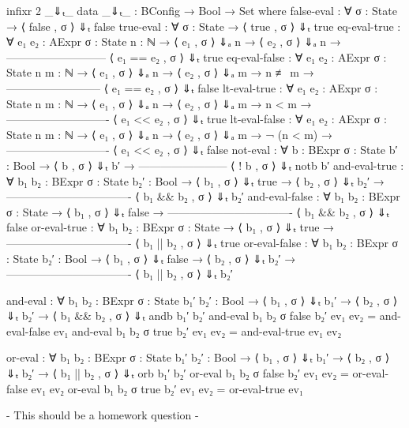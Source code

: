 \documentclass{lecturenotes}
\begin{document}
\begin{code}[hide]
infixr 2 _⇓ₜ_
data _⇓ₜ_ : BConfig → Bool → Set where
     false-eval : ∀ {σ : State} → ⟨ false , σ ⟩ ⇓ₜ false
     true-eval : ∀ {σ : State} → ⟨ true , σ ⟩ ⇓ₜ true
     eq-eval-true : ∀ {e₁ e₂ : AExpr} {σ : State} {n : ℕ} →
              ⟨ e₁ , σ ⟩ ⇓ₐ n →
              ⟨ e₂ , σ ⟩ ⇓ₐ n →
       ---------------------------
        ⟨ e₁ == e₂ , σ ⟩ ⇓ₜ true
     eq-eval-false : ∀ {e₁ e₂ : AExpr} {σ : State} {n m : ℕ} →
             ⟨ e₁ , σ ⟩ ⇓ₐ n →
             ⟨ e₂ , σ ⟩ ⇓ₐ m →
                  n ≢ m →
       --------------------------
       ⟨ e₁ == e₂ , σ ⟩ ⇓ₜ false
     lt-eval-true : ∀ {e₁ e₂ : AExpr} {σ : State} {n m : ℕ} →
              ⟨ e₁ , σ ⟩ ⇓ₐ n →
              ⟨ e₂ , σ ⟩ ⇓ₐ m →
                       n < m →
       ----------------------------
        ⟨ e₁ << e₂ , σ ⟩ ⇓ₜ true
     lt-eval-false : ∀ {e₁ e₂ : AExpr} {σ : State} {n m : ℕ} →
              ⟨ e₁ , σ ⟩ ⇓ₐ n →
              ⟨ e₂ , σ ⟩ ⇓ₐ m →
                       ¬ (n < m) →
       ----------------------------
        ⟨ e₁ << e₂ , σ ⟩ ⇓ₜ false
     not-eval : ∀ {b : BExpr} {σ : State} {b′ : Bool} → 
          ⟨ b , σ ⟩ ⇓ₜ b′ →
       ------------------------
        ⟨ ! b , σ ⟩ ⇓ₜ notb b′
     and-eval-true : ∀ {b₁ b₂ : BExpr} {σ : State} {b₂′ : Bool} →
              ⟨ b₁ , σ ⟩ ⇓ₜ true →
              ⟨ b₂ , σ ⟩ ⇓ₜ b₂′ →
       ----------------------------------
        ⟨ b₁ && b₂ , σ ⟩ ⇓ₜ b₂′
     and-eval-false : ∀ {b₁ b₂ : BExpr} {σ : State} → 
              ⟨ b₁ , σ ⟩ ⇓ₜ false →
       ----------------------------------
        ⟨ b₁ && b₂ , σ ⟩ ⇓ₜ false
     or-eval-true : ∀ {b₁ b₂ : BExpr} {σ : State} →
              ⟨ b₁ , σ ⟩ ⇓ₜ true →
       ----------------------------------
        ⟨ b₁ || b₂ , σ ⟩ ⇓ₜ true
     or-eval-false : ∀ {b₁ b₂ : BExpr} {σ : State} {b₂′ : Bool} → 
              ⟨ b₁ , σ ⟩ ⇓ₜ false →
              ⟨ b₂ , σ ⟩ ⇓ₜ b₂′ → 
       ----------------------------------
        ⟨ b₁ || b₂ , σ ⟩ ⇓ₜ b₂′ 

and-eval : ∀ {b₁ b₂ : BExpr} {σ : State} {b₁′ b₂′ : Bool} →
  ⟨ b₁ , σ ⟩ ⇓ₜ b₁′ →
  ⟨ b₂ , σ ⟩ ⇓ₜ b₂′ →
  ⟨ b₁ && b₂ , σ ⟩ ⇓ₜ andb b₁′ b₂′
and-eval {b₁} {b₂} {σ} {false} {b₂′} ev₁ ev₂ = and-eval-false ev₁
and-eval {b₁} {b₂} {σ} {true} {b₂′} ev₁ ev₂ = and-eval-true ev₁ ev₂

or-eval : ∀ {b₁ b₂ : BExpr} {σ : State} {b₁′ b₂′ : Bool} →
  ⟨ b₁ , σ ⟩ ⇓ₜ b₁′ →
  ⟨ b₂ , σ ⟩ ⇓ₜ b₂′ →
  ⟨ b₁ || b₂ , σ ⟩ ⇓ₜ orb b₁′ b₂′
or-eval {b₁} {b₂} {σ} {false} {b₂′} ev₁ ev₂ = or-eval-false ev₁ ev₂
or-eval {b₁} {b₂} {σ} {true} {b₂′} ev₁ ev₂ = or-eval-true ev₁


{- This should be a homework question -}


\end{code}
\end{document}
